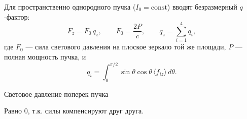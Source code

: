 \documentclass[a4paper]{article}
\begin{document}
Для пространственно однородного пучка ($I_0 = \text{const}$) вводят безразмерный $q$-фактор:
\begin{equation}
    F_z = F_0 \, q_z, \qquad F_0 = \frac{2P}{c}, \qquad q_z = \sum_{i=1}^{4} q_i, \tag{31}
\end{equation}
где $F_0$ --- сила светового давления на плоское зеркало той же площади, $P$ --- полная мощность пучка, и
\begin{equation}
    q_i = \int_0^{\pi/2} \sin \theta \cos \theta \, \langle f_{iz} \rangle \, d\theta. \tag{31}
\end{equation}

$\textbf{Световое давление поперек пучка}$\par

Равно 0, т.к. силы компенсируют друг друга.







\end{document}
